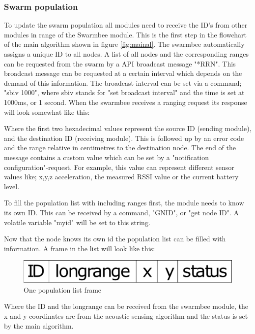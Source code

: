 \documentclass[10pt,a4paper]{article}
\begin{document}
\subsubsection{Swarm population}
To update the swarm population all modules need to receive the ID's from other modules in range of the Swarmbee module. This is the first step in the flowchart of the main algorithm shown in figure  \ref{fig:mainal}. The swarmbee automatically assigns a unique ID to all nodes. A list of all nodes and the corresponding ranges can be requested from the swarm by a API broadcast message "*RRN". This broadcast message can be requested at a certain interval which depends on the demand of this information. The broadcast interval can be set via a command; "sbiv 1000", where sbiv stands for "set broadcast interval" and the time is set at 1000ms, or 1 second. When the swarmbee receives a ranging request its response will look somewhat like this:



Where the first two hexadecimal values represent the source ID (sending module), and the destination ID (receiving module). This is followed up by an error code and the range relative in centimetres to the destination node. The end of the message contains a custom value which can be set by a "notification configuration"-request. For example, this value can represent different sensor values like; x,y,z acceleration, the measured RSSI value or the current battery level.

To fill the population list with including ranges first, the module needs to know its own ID. This can be received by a command, "GNID", or "get node ID". A volatile variable "myid" will be set to this string.

Now that the node knows its own id the population list can be filled with information. A frame in the list will look like this:

\begin{figure}[H]
    \centering
    \includegraphics[scale=0.30]{popframe.pdf}
    \caption{One population list frame}
    \label{fig:frame}
 \end{figure}

Where the ID and the longrange can be received from the swarmbee module, the x and y coordinates are from the acoustic sensing algorithm and the status is set by the main algorithm.
\end{document}
